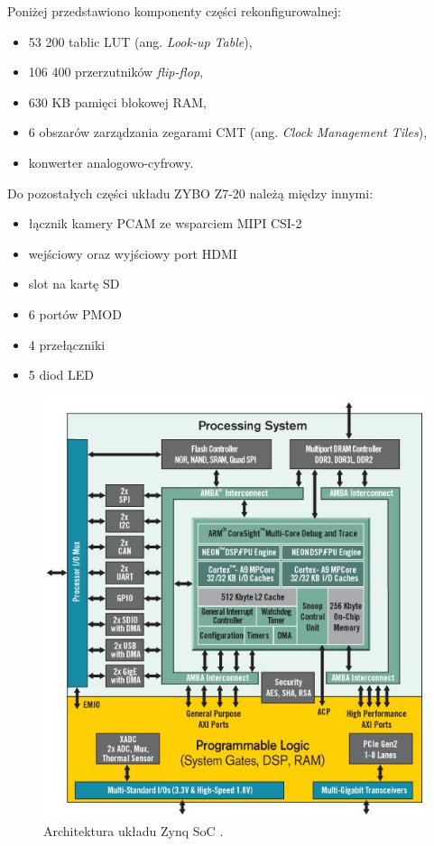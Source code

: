 Poniżej przedstawiono komponenty części rekonfigurowalnej:
\begin{itemize}
	\item 53 200 tablic LUT (ang. \textit{Look-up Table}),
	\item 106 400 przerzutników \textit{flip-flop},
	\item 630 KB pamięci blokowej RAM,
	\item 6 obszarów zarządzania zegarami CMT (ang. \textit{Clock Management Tiles}),
	\item konwerter analogowo-cyfrowy.
\end{itemize}
Do pozostałych części układu ZYBO Z7-20 należą między innymi:
\begin{itemize}
	\item łącznik kamery PCAM ze wsparciem MIPI CSI-2
	\item wejściowy oraz wyjściowy port HDMI
	\item slot na kartę SD
	\item 6 portów PMOD
	\item 4 przełączniki
	\item 5 diod LED
\end{itemize}
\begin{figure}[h]
	\centering
	\includegraphics[width=\textwidth]{zynq.png}
	\caption{Architektura układu Zynq SoC \cite{zynq}.}
	\label{fig:zynq}
\end{figure}

